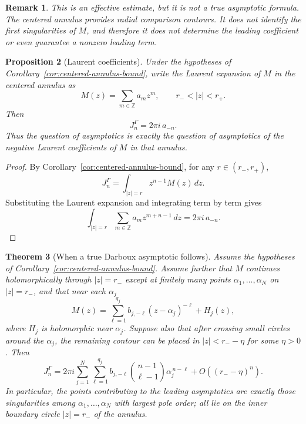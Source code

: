 \documentclass[11pt]{article}
\newtheorem{theorem}{Theorem}[section]
\newtheorem{proposition}[theorem]{Proposition}
\newtheorem{remark}[theorem]{Remark}
\newcommand{\dd}{\,d}
\newcommand{\1}{\mathbf 1}
\begin{document}
\begin{remark}
This is an effective estimate, but it is not a true asymptotic formula. The centered annulus
provides radial comparison contours. It does not identify the first singularities of \(M\),
and therefore it does not determine the leading coefficient or even guarantee a nonzero
leading term.
\end{remark}

\begin{proposition}[Laurent coefficients]\label{prop:laurent-annulus}
Under the hypotheses of Corollary~\ref{cor:centered-annulus-bound}, write the Laurent
expansion of \(M\) in the centered annulus as
\[
  M(z)=\sum_{m\in\mathbb Z} a_m z^m,
  \qquad r_-<|z|<r_+.
\]
Then
\begin{equation}\label{eq:J-laurent-coeff}
  J_n^\Gamma=2\pi i\,a_{-n}.
\end{equation}
Thus the question of asymptotics is exactly the question of asymptotics of the negative
Laurent coefficients of \(M\) in that annulus.
\end{proposition}

\begin{proof}
By Corollary~\ref{cor:centered-annulus-bound}, for any \(r\in(r_-,r_+)\),
\[
  J_n^\Gamma=\int_{|z|=r}z^{n-1}M(z)\dd z.
\]
Substituting the Laurent expansion and integrating term by term gives
\[
  \int_{|z|=r}\sum_{m\in\mathbb Z}a_m z^{m+n-1}\dd z=2\pi i\,a_{-n}.
\]
\end{proof}

\begin{theorem}[When a true Darboux asymptotic follows]\label{thm:exact-darboux-annulus}
Assume the hypotheses of Corollary~\ref{cor:centered-annulus-bound}. Assume further that
\(M\) continues holomorphically through \(|z|=r_-\) except at finitely many points
\(\alpha_1,\dots,\alpha_N\) on \(|z|=r_-\), and that near each \(\alpha_j\)
\begin{equation}\label{eq:finite-singularity-model}
  M(z)=\sum_{\ell=1}^{q_j}b_{j,-\ell}(z-\alpha_j)^{-\ell}+H_j(z),
\end{equation}
where \(H_j\) is holomorphic near \(\alpha_j\). Suppose also that after crossing small
circles around the \(\alpha_j\), the remaining contour can be placed in \(|z|<r_- -\eta\)
for some \(\eta>0\). Then
\begin{equation}\label{eq:exact-pole-asymptotic-annulus}
  J_n^\Gamma
  =
  2\pi i\sum_{j=1}^N\sum_{\ell=1}^{q_j}
  b_{j,-\ell}\binom{n-1}{\ell-1}\alpha_j^{\,n-\ell}
  +O((r_- -\eta)^n).
\end{equation}
In particular, the points contributing to the leading asymptotics are exactly those
singularities among \(\alpha_1,\dots,\alpha_N\) with largest pole order; all lie on the
inner boundary circle \(|z|=r_-\) of the annulus.
\end{theorem}
\end{document}
